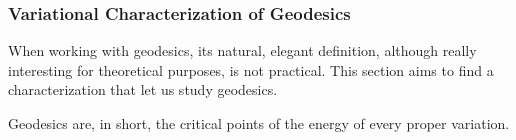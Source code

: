 \subsubsection*{Variational Characterization of Geodesics}

When working with geodesics, its natural, elegant definition, although really interesting for theoretical purposes, is not practical. This section aims to find a characterization that let us study geodesics.

Geodesics are, in short, the critical points of the energy of every proper variation.